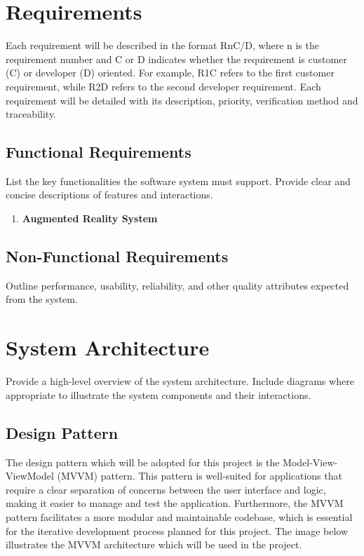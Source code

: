 \documentclass[10pt]{article}
\begin{document}
\newpage

\section{Requirements}
Each requirement will be described in the format R{n}C/D, where n is the requirement number and C or D indicates whether the requirement is customer (C) or developer (D) oriented. For example,
R1C refers to the first customer requirement, while R2D refers to the second developer requirement. Each requirement will be detailed with its description, priority, verification method and traceability.

    \subsection{Functional Requirements}
    List the key functionalities the software system must support. Provide clear and concise descriptions of features and interactions.

    \begin{enumerate}
        \item \textbf{Augmented Reality System}
    \end{enumerate}

    \subsection{Non-Functional Requirements}
    Outline performance, usability, reliability, and other quality attributes expected from the system.

\section{System Architecture}
Provide a high-level overview of the system architecture. Include diagrams where appropriate to illustrate the system components and their interactions.

    \subsection{Design Pattern}

    The design pattern which will be adopted for this project is the Model-View-ViewModel (MVVM) pattern. This pattern is well-suited for applications that require a clear separation
    of concerns between the user interface and logic, making it easier to manage and test the application. Furthermore, the MVVM pattern facilitates a more modular and maintainable
    codebase, which is essential for the iterative development process planned for this project. The image below illustrates the MVVM architecture which will be used in the project.
\end{document}
